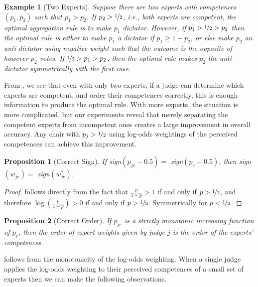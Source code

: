 \documentclass[letterpaper]{article} %
\newtheorem{proposition}{Proposition}
\newtheorem{example}{Example}
\newcommand{\judge}{\ensuremath{j} }
\newcommand{\expert}{\ensuremath{e} }
\begin{document}
 \begin{example}[Two Experts]\label{example:two_experts}
 Suppose there are two experts with competences $(p_1, p_2)$ such that $p_1 > p_2$. If $p_2 > \nicefrac{1}{2}$, i.e., both experts are competent, the optimal aggregation rule is to make $p_1$ dictator. However, if $p_1 > \nicefrac{1}{2} > p_2$ then the optimal rule is either to make $p_1$ a dictator if $p_1 \geq 1 - p_2$, or else make $p_2$ an anti-dictator using negative weight such that the outcome is the opposite of however $p_2$ votes. If $\nicefrac{1}{2} > p_1 > p_2$, then the optimal rule makes $p_2$ the anti-dictator symmetrically with the first case.
 \end{example}

 From , we see that even with only two experts, if a judge can determine which experts are competent, and order their competences correctly, this is enough information to produce the optimal rule. With more experts, the situation is more complicated, but our experiments reveal that merely separating the competent experts from incompetent ones creates a large improvement in overall accuracy. Any chair with $p_j > \nicefrac{1}{2}$ using log-odds weightings of the perceived competences can achieve this improvement.

\begin{proposition}[Correct Sign]\label{prop:single_j_correct_sign}
 If sign$(p_{\judge \expert} - 0.5) = $ sign$(p_{\expert}-0.5)$, then sign$(w_{\judge \expert}) = $ sign$(w^*_{\judge \expert})$.
\end{proposition}

\begin{proof}
  follows directly from the fact that $\frac{p}{1-p} > 1$ if and only if $p > \nicefrac{1}{2}$, and therefore $\log(\frac{p}{1-p}) > 0$ if and only if $p > \nicefrac{1}{2}$. Symmetrically for $p < \nicefrac{1}{2}$.
\end{proof}

\begin{proposition}[Correct Order]\label{prop:single_j_correct_order}
 If $p_{\judge \expert}$ is a strictly monotonic increasing function of $p_\expert$, then the order of expert weights given by judge $j$ is the order of the experts' competences. 
\end{proposition}

 follows from the monotonicity of the log-odds weighting. When a single judge applies the log-odds weighting to their perceived competences of a small set of experts then we can make the following observations.
 
\end{document}
